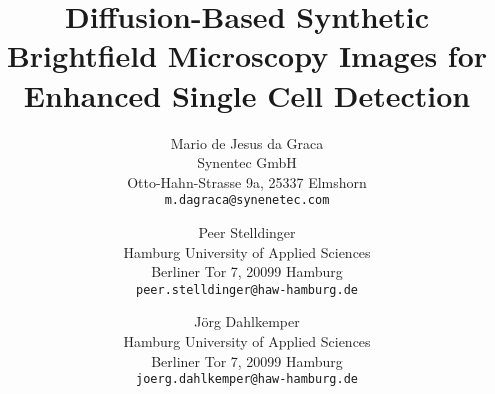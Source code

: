 \documentclass[10pt,twocolumn,letterpaper]{article}
\title{Diffusion-Based Synthetic Brightfield Microscopy Images for Enhanced Single Cell Detection}
\author{Mario de Jesus da Graca\\
Synentec GmbH\\
Otto-Hahn-Strasse 9a, 25337 Elmshorn\\
{\tt\small m.dagraca@synenetec.com}
\and
Peer Stelldinger\\
Hamburg University of Applied Sciences\\
Berliner Tor 7, 20099 Hamburg\\
{\tt\small peer.stelldinger@haw-hamburg.de}
\and
Jörg Dahlkemper\\
Hamburg University of Applied Sciences\\
Berliner Tor 7, 20099 Hamburg\\
{\tt\small joerg.dahlkemper@haw-hamburg.de}
}
\begin{document}
\maketitle







{
    \small
    
    
}

% 
\end{document}
